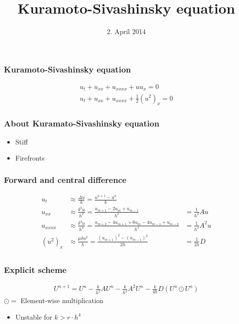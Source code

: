 \documentclass[screen]{beamer}
\title[Kuramoto-Sivashinsky]%
{Kuramoto-Sivashinsky equation}
\date{2. April 2014}
\begin{document}
\begin{frame}
\titlepage
\end{frame}

\begin{frame}
\frametitle{Kuramoto-Sivashinsky equation}
\Large
\begin{align*}
u_t + u_{xx} + u_{xxxx} + uu_x = 0 \\
u_t + u_{xx} + u_{xxxx} + \frac{1}{2}(u^2)_x = 0
\end{align*}
\end{frame}


\begin{frame}
\frametitle{About Kuramato-Sivashinsky equation}
\begin{itemize}
\item Stiff
\item Firefronts
\end{itemize}

\end{frame}


\begin{frame}
\frametitle{Forward and central difference}
\begin{align*}
u_t &\approx \frac{\Delta u}{k} = \frac{u^{n+1}-u^n}{k} \\
u_{xx} &\approx \frac{\delta^2 u}{h^2} = \frac{u_{m+1}-2u_{m}+u_{m-1}}{h^2} &= \frac{1}{h^2}Au \\
u_{xxxx} &\approx \frac{\delta^4 u}{h^4} = \frac{u_{m+2}-4u_{m+1}+6u_m-4u_{m-1}+u_{m-2}}{h^4} &= \frac{1}{h^4}A^2u\\
(u^2)_{x} &\approx \frac{\mu \delta u^2}{h} = \frac{(u_{m+1})^2-(u_{m-1})^2}{2h} &= \frac{1}{2h}D\\
\end{align*}
\end{frame}


\begin{frame}
\frametitle{Explicit scheme}
\flushright

\begin{align*}
U^{n+1} = U^n - \frac{k}{h^2}AU^n - \frac{k}{h^4}A^2U^n - \frac{k}{4h}D(U^{n}\odot U^n)
\end{align*}
$\odot =$ Element-wise multiplication
\begin{itemize}
\item Unstable for $k > r \cdot h^4$

\end{itemize}
\end{frame}
\end{document}
